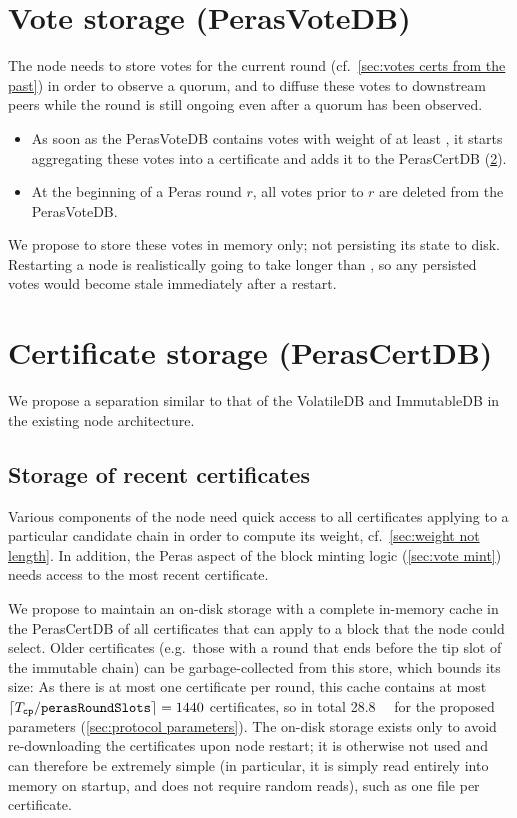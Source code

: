 \section{Vote storage (PerasVoteDB)}\label{sec:vote db}

The node needs to store votes for the current round (cf.~\cref{sec:votes certs from the past}) in order to observe a quorum, and to diffuse these votes to downstream peers while the round is still ongoing even after a quorum has been observed.

\begin{itemize}
\item
  As soon as the PerasVoteDB contains votes with weight of at least \perasQuorum, it starts aggregating these votes into a certificate and adds it to the PerasCertDB (\cref{sec:cert db}).
\item
  At the beginning of a Peras round $r$, all votes prior to $r$ are deleted from the PerasVoteDB\@.
\end{itemize}

We propose to store these votes in memory only; not persisting its state to disk.
Restarting a node is realistically going to take longer than \perasRoundSlots{}, so any persisted votes would become stale immediately after a restart.

\section{Certificate storage (PerasCertDB)}\label{sec:cert db}

We propose a separation similar to that of the VolatileDB and ImmutableDB in the existing node architecture.

\subsection{Storage of recent certificates}
Various components of the node need quick access to all certificates applying to a particular candidate chain in order to compute its weight, cf.~\cref{sec:weight not length}.
In addition, the Peras aspect of the block minting logic (\cref{sec:vote mint}) needs access to the most recent certificate.

We propose to maintain an on-disk storage with a complete in-memory cache in the PerasCertDB of all certificates that can apply to a block that the node could select.
Older certificates (e.g.\ those with a round that ends before the tip slot of the immutable chain) can be garbage-collected from this store, which bounds its size:
As there is at most one certificate per round, this cache contains at most $\lceil T_{\mathtt{cp}} / \mathtt{perasRoundSlots} \rceil = 1440$ certificates, so in total \qty{28.8}{\mega\byte} for the proposed parameters (\cref{sec:protocol parameters}).
The on-disk storage exists only to avoid re-downloading the certificates upon node restart; it is otherwise not used and can therefore be extremely simple (in particular, it is simply read entirely into memory on startup, and does not require random reads), such as one file per certificate.

